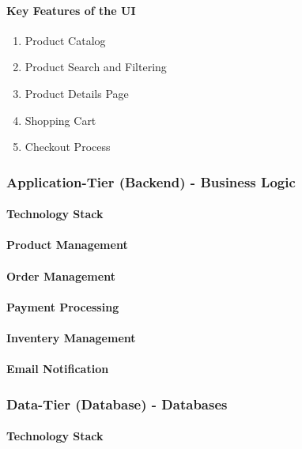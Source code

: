 \documentclass{llncs}
\begin{document}
\paragraph{Key Features of the UI}
    \begin{enumerate}
        \item Product Catalog
        \item Product Search and Filtering
        \item Product Details Page
        \item Shopping Cart
        \item Checkout Process
    \end{enumerate}
\subsubsection{Application-Tier (Backend) - Business Logic}
\paragraph{Technology Stack}
\paragraph{Product Management}
\paragraph{Order Management}
\paragraph{Payment Processing}
\paragraph{Inventery Management}
\paragraph{Email Notification}

\subsubsection{Data-Tier (Database) - Databases}
\paragraph{Technology Stack}
\end{document}
